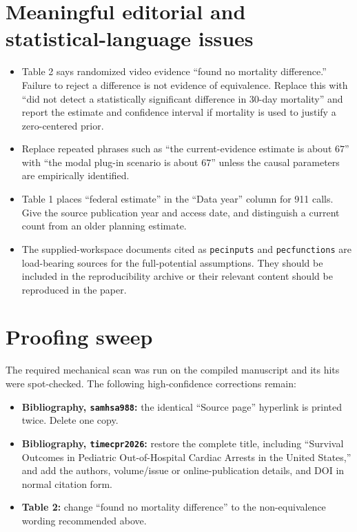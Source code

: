 \documentclass[11pt]{article}
\begin{document}
\section*{Meaningful editorial and statistical-language issues}

\begin{itemize}
\item Table 2 says randomized video evidence ``found no mortality difference.''
Failure to reject a difference is not evidence of equivalence.  Replace this
with ``did not detect a statistically significant difference in 30-day
mortality'' and report the estimate and confidence interval if mortality is
used to justify a zero-centered prior.
\item Replace repeated phrases such as ``the current-evidence estimate is about
$67$'' with ``the modal plug-in scenario is about $67$'' unless the causal
parameters are empirically identified.
\item Table 1 places ``federal estimate'' in the ``Data year'' column for 911
calls.  Give the source publication year and access date, and distinguish a
current count from an older planning estimate.
\item The supplied-workspace documents cited as \texttt{pecinputs} and
\texttt{pecfunctions} are load-bearing sources for the full-potential
assumptions.  They should be included in the reproducibility archive or their
relevant content should be reproduced in the paper.
\end{itemize}

\section*{Proofing sweep}

The required mechanical scan was run on the compiled manuscript and its hits
were spot-checked.  The following high-confidence corrections remain:
\begin{itemize}
\item \textbf{Bibliography, \texttt{samhsa988}:} the identical ``Source page''
hyperlink is printed twice.  Delete one copy.
\item \textbf{Bibliography, \texttt{timecpr2026}:} restore the complete title,
including ``Survival Outcomes in Pediatric Out-of-Hospital Cardiac Arrests in
the United States,'' and add the authors, volume/issue or online-publication
details, and DOI in normal citation form.
\item \textbf{Table 2:} change ``found no mortality difference'' to the
non-equivalence wording recommended above.
\end{itemize}
\end{document}
